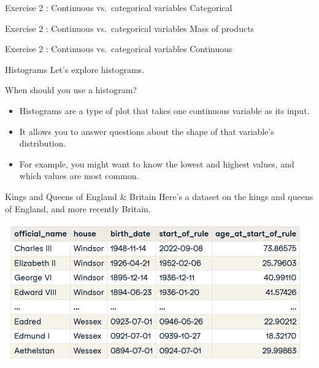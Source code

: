 \documentclass[
  ignorenonframetext,
]{beamer}
\begin{document}
\begin{frame}{Exercise 2 : Continuous vs.~categorical variables}
\label{exercise-2-continuous-vs.-categorical-variables-9}
Categorical
\end{frame}

\begin{frame}{Exercise 2 : Continuous vs.~categorical variables}
\label{exercise-2-continuous-vs.-categorical-variables-10}
Mass of products
\end{frame}

\begin{frame}{Exercise 2 : Continuous vs.~categorical variables}
\label{exercise-2-continuous-vs.-categorical-variables-11}
Continuous
\end{frame}

\begin{frame}{Histograms}
\label{histograms}
Let's explore histograms.
\end{frame}

\begin{frame}{When should you use a histogram?}
\label{when-should-you-use-a-histogram}
\begin{itemize}
\item
  Histograms are a type of plot that takes one continuous variable as
  its input.
\item
  It allows you to answer questions about the shape of that variable's
  distribution.
\item
  For example, you might want to know the lowest and highest values, and
  which values are most common.
\end{itemize}
\end{frame}

\begin{frame}{Kings and Queens of England \& Britain}
\label{kings-and-queens-of-england-britain}
Here's a dataset on the kings and queens of England, and more recently
Britain.

\includegraphics{../images/im6.png}
\end{frame}
\end{document}

